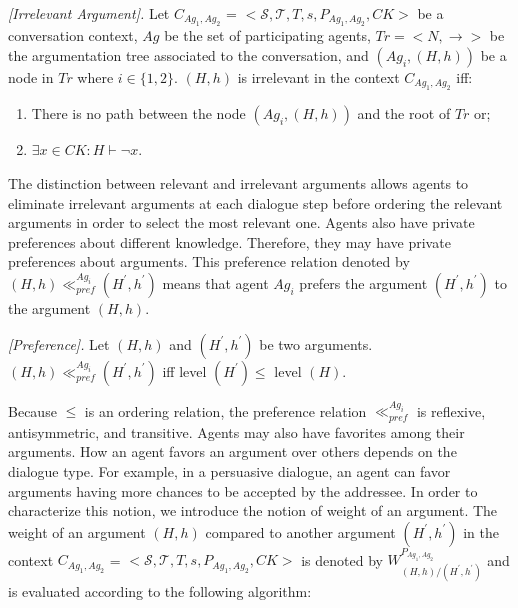 \begin{definition}{\emph{[Irrelevant Argument]. }} \label{irrelevant}
Let $C_{Ag_1,Ag_2}$ = $\big<\mathcal{S}, \mathcal{T},T, s,P_{Ag_1,Ag_2},CK \big>$ be a conversation context, $Ag$ be the
set of participating agents, $Tr = \big<N, \rightarrow \big>$ be the argumentation tree associated to the conversation, and $(Ag_i,
(H, h))$ be a node in $Tr$ where $i \in \{1, 2\}$. $(H, h)$ is irrelevant in the context $C_{Ag_1,Ag_2}$ iff:

\begin{enumerate}
  \item  There is no path between the node $(Ag_i, (H, h))$ and the root of $Tr$ or;
  \item  $\exists x \in  CK : H \vdash \neg x$.

\end{enumerate}
\end{definition}

The distinction between relevant and irrelevant arguments allows agents to eliminate irrelevant arguments at each dialogue step before
ordering the relevant arguments in order to select the most relevant one.
Agents also have private preferences about different knowledge. Therefore, they may have private preferences about arguments.
This preference relation denoted by $(H, h)  \ll^{Ag_i}_{pref}  (H^{\prime}, h^{\prime})$ means that agent $Ag_i$ prefers the
argument $(H^{\prime}, h^{\prime})$ to the argument $(H, h)$.

\begin{definition}{\emph{[Preference]. }} \label{preference}
Let $(H, h)$ and $(H^{\prime}, h^{\prime})$ be two arguments. $(H, h)  \ll^{Ag_i}_{pref}  (H^{\prime}, h^{\prime})$ iff level $(H^{\prime}) \leq$ level $(H)$.
\end{definition}

Because $\leq$ is an ordering relation, the preference relation $\ll^{Ag_i}_{pref}$ is reflexive, antisymmetric, and transitive.
Agents may also have favorites among their arguments. How an agent favors an argument over others depends on the dialogue type. For
example, in a persuasive dialogue, an agent can favor arguments having more chances to be accepted by the addressee. In order to
characterize this notion, we introduce the notion of weight of an argument. The weight of an argument $(H,h)$ compared to another
argument $(H^{\prime},h^{\prime})$ in the context $C_{Ag_1,Ag_2}$ = $\big<\mathcal{S},\mathcal{T},T, s,P_{Ag_1,Ag_2},CK\big>$ is
denoted by $W_{(H,h)/(H^{\prime},h^{\prime})}^{P_{Ag_1,Ag_2}}$ and is evaluated according to the following algorithm:

